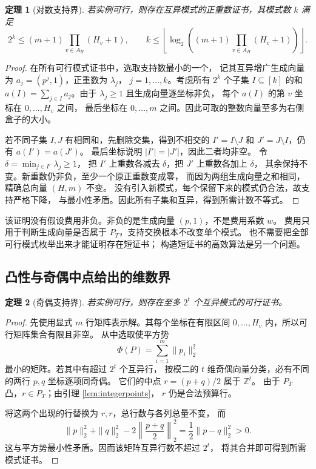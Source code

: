 \documentclass[UTF8,a4paper,11pt,fontset=fandol]{ctexart}
\newtheorem{theorem}{定理}[section]
\theoremstyle{definition}
\newcommand{\Z}{\mathbb Z}
\begin{document}
\begin{theorem}[对数支持界]\label{thm:logsparse}
若实例可行，则存在互异模式的正重数证书，其模式数 $k$ 满足
\begin{equation}\label{eq:logsparse}
2^k\le(m+1)\prod_{v\in A_H}(H_v+1),\qquad
k\le\left\lfloor\log_2\left((m+1)
\prod_{v\in A_H}(H_v+1)\right)\right\rfloor.
\end{equation}
\end{theorem}
\begin{proof}
在所有可行模式证书中，选取支持数最小的一个，
记其互异增广生成向量为 $a_j=(p^j,1)$，正重数为 $\lambda_j$，
$j=1,\ldots,k$。考虑所有 $2^k$ 个子集 $I\subseteq[k]$ 的和
$a(I)=\sum_{j\in I}a_j$。由于 $\lambda_j\ge1$ 且生成向量逐坐标非负，
每个 $a(I)$ 的第 $v$ 坐标在 $0,\ldots,H_v$ 之间，
最后坐标在 $0,\ldots,m$ 之间。因此可取的整数向量至多为右侧盒子的大小。

若不同子集 $I,J$ 有相同和，先删除交集，得到不相交的
$I'=I\setminus J$ 和 $J'=J\setminus I$，仍有 $a(I')=a(J')$。
最后坐标说明 $|I'|=|J'|$，因此二者均非空。
令 $\delta=\min_{j\in I'}\lambda_j\ge1$，
把 $I'$ 上重数各减去 $\delta$，把 $J'$ 上重数各加上 $\delta$，
其余保持不变。新重数仍非负，至少一个原正重数变成零，
而因为两组生成向量之和相同，精确总向量 $(H,m)$ 不变。
没有引入新模式，每个保留下来的模式仍合法，故支持严格下降，
与最小性矛盾。因此所有子集和互异，得到所需计数不等式。
\end{proof}

该证明没有假设费用非负。非负的是生成向量 $(p,1)$，不是费用系数 $w$。
费用只用于判断生成向量是否属于 $P_T$，支持交换根本不改变单个模式。
也不需要把全部可行模式枚举出来才能证明存在短证书；
构造短证书的高效算法是另一个问题。

\subsection{凸性与奇偶中点给出的维数界}

\begin{theorem}[奇偶支持界]\label{thm:paritysparse}
若实例可行，则存在至多 $2^t$ 个互异模式的可行证书。
\end{theorem}
\begin{proof}
先使用显式 $m$ 行矩阵表示解。其每个坐标在有限区间
$0,\ldots,H_v$ 内，所以可行矩阵集合有限且非空。
从中选取使平方势
\[
\Phi(P)=\sum_{i=1}^m\|p_i\|_2^2
\]
最小的矩阵。若其中有超过 $2^t$ 个互异行，
按模二的 $t$ 维奇偶向量分类，必有不同的两行 $p,q$ 坐标逐项同奇偶。
它们的中点 $r=(p+q)/2$ 属于 $\Z^t$。
由于 $P_T$ 凸，$r\in P_T$；由引理 \ref{lem:integerpoints}，
$r$ 仍是合法预算行。

将这两个出现的行替换为 $r,r$，总行数与各列总量不变，
而
\[
\|p\|_2^2+\|q\|_2^2-2\left\|\frac{p+q}{2}\right\|_2^2
=\frac12\|p-q\|_2^2>0.
\]
这与平方势最小性矛盾。因而该矩阵互异行数不超过 $2^t$，
将其合并即可得到所需模式证书。
\end{proof}
\end{document}
